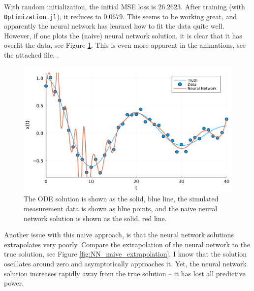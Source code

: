 \documentclass[10pt,a4paper]{article}
\begin{document}
With random initialization, the initial MSE loss is $26.2623$. After training (with \texttt{Optimization.jl}), it reduces to $0.0679$.
This seems to be working great, and apparently the neural network has learned how to fit the data quite well.
However, if one plots the (naive) neural network solution, it is clear that it has overfit the data, see Figure \ref{fig:NN_naive}.
This is even more apparent in the animations, see the attached file, .

\begin{figure}[H]
    \includegraphics[width=\linewidth]{no_ode.pdf}
    \caption{The ODE solution is shown as the solid, blue line,
        the simulated measurement data is shown as blue points,
        and the naive neural network solution is shown as the solid, red line.}
    \label{fig:NN_naive}
\end{figure}

Another issue with this naive approach, is that the neural network solutions extrapolates very poorly.
Compare the extrapolation of the neural network to the true solution, see Figure \ref{fig:NN_naive_extrapolation}.
I know that the solution oscillates around zero and asymptotically approaches it.
Yet, the neural network solution increases rapidly away from the true solution -- it has lost all predictive power.
\end{document}
